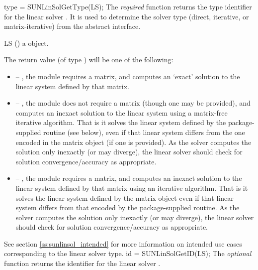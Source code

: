 {
  type = SUNLinSolGetType(LS);
}
{
  The \textit{required} function  returns the
  type identifier for the linear solver . It is used to
  determine the solver type (direct, iterative, or matrix-iterative) from
  the abstract  interface.
}
{
  \begin{args}[LS]
  \item[LS] ()
    a {\sunlinsol} object.
  \end{args}
}
{
  The return value  (of type ) will be one of the
  following:
  \begin{itemize}
  \item {} -- , the {\sunlinsol} module requires
  a matrix, and computes an `exact' solution to the linear system defined by
  that matrix.
  \item {} -- , the {\sunlinsol} module does
  not require a matrix (though one may be provided), and computes an inexact
  solution to the linear system using a matrix-free iterative algorithm. That is
  it solves the linear system defined by the package-supplied 
  routine (see  below), even if that linear
  system differs from the one encoded in the matrix object (if one is
  provided). As the solver computes the solution only inexactly (or may
  diverge), the linear solver should check for solution convergence/accuracy as
  appropriate.
  \item {} -- , the {\sunlinsol}
  module requires a matrix, and computes an inexact solution to the linear
  system defined by that matrix using an iterative algorithm. That is it solves
  the linear system defined by the matrix object even if that linear system
  differs from that encoded by the package-supplied  routine. As the
  solver computes the solution only inexactly (or may diverge), the linear
  solver should check for solution convergence/accuracy as appropriate.
  \end{itemize}
}
{
 See section \ref{ss:sunlinsol_intended} for more information on intended use
 cases corresponding to the linear solver type.
}
{
  id = SUNLinSolGetID(LS);
}
{
  The \textit{optional} function  returns the
  identifier for the linear solver .
}
